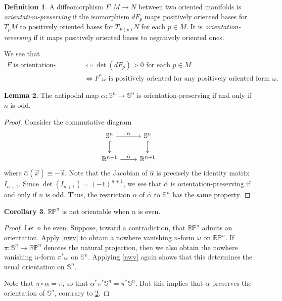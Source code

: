 \documentclass[10pt,letterpaper,cm]{nupset}
\theoremstyle{definition}
\newtheorem{definition}{Definition}[subsection]
\theoremstyle{theorem}
\newtheorem{lemma}[definition]{Lemma}
\newtheorem{corollary}[definition]{Corollary}
\theoremstyle{remark}
\newcommand{\R}{\mathbb R}
\newcommand{\RP}{\mathbb{RP}}
\renewcommand{\S}{\mathbb S}
\newcommand{\1}{\mathbf{1}}
\newcommand{\x}{\vec x}
\newcommand{\0}{\vec 0}
\begin{document}
\begin{definition}
A diffeomorphism $F: M \to N$ between two oriented manifolds is \textit{orientation-preserving} if the isomorphism $dF_p$ maps positively oriented bases for $T_pM$ to positively oriented bases for $T_{F(p)}N$ for each $p\in M$. It is \textit{orientation-reversing} if it maps positively oriented bases to negatively oriented ones.
\end{definition}

We see that 
\begin{align*}
F \text{ is orientation-preserving } & \iff \det(dF_p) >0 \text{ for each }p \in M
\\ &  \iff  F^{\ast}\omega \text{ is positively oriented for any positively oriented form }\omega.
\end{align*}

\begin{lemma}\label{antip}
The antipodal map $\alpha : \S^n \to \S^n$ is orientation-preserving  if and only if $n$ is odd.
\end{lemma}
\begin{proof}
Consider the commutative diagram
\[
\begin{tikzcd}
\S^n \arrow[r, "\alpha"] \arrow[d, hook] & \S^n \arrow[d, hook] \\
\R^{n+1} \arrow[r, "\hat{\alpha}"] & \R^{n+1}
\end{tikzcd}
\]
where $\hat{\alpha}(\x) \equiv {-\x}$. Note that the Jacobian of $\hat{\alpha}$ is precisely the identity matrix $I_{n+1}$. Since $\det(I_{n+1}) = ({-1})^{n+1}$, we see that $\hat{\alpha}$ is orientation-preserving  if and only if $n$ is odd. Thus, the restriction $\alpha$ of $\hat{\alpha}$ to $\S^n$ has the same property.
\end{proof}

\begin{corollary}\label{RPor}
$\RP^n$ is not orientable when $n$ is even. 
\end{corollary}
\begin{proof}
Let $n$ be even. Suppose, toward a contradiction, that $\RP^n$ admits an orientation. Apply \cref{nwv} to obtain a nowhere vanishing $n$-form $\omega$ on $\RP^n$. If $\pi : \S^n \to \RP^n$ denotes the natural projection, then we also obtain the nowhere vanishing $n$-form $\pi^{\ast}\omega$ on $\S^n$. Applying \cref{nwv} again shows that this determines the usual orientation on $\S^n$. 

Note that $\pi \circ \alpha = \pi$, so that $\alpha^{\ast} \pi^{\ast} \S^n = \pi^{\ast}\S^n$. But this implies that $\alpha$ preserves the orientation of $\S^n$, contrary to \cref{antip}.
\end{proof}
\end{document}
